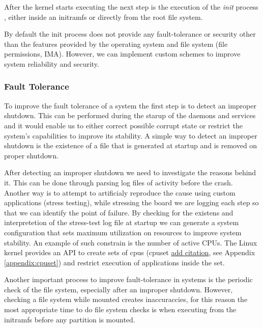 After the kernel starts executing the next step is the execution of the \textit{init} process , either inside an initramfs  or directly from the root file system.

By default the init process does not provide any fault-tolerance or security other than the features provided by the operating system and file system (file permissions, IMA). However, we can implement custom schemes to improve system reliability and security.

\subsubsection{Fault Tolerance}

To improve the fault tolerance of a system the first step is to detect an improper shutdown. This can be performed during the starup of the daemons and services and it would enable us to either correct possible corrupt state or restrict the system's capabilities to improve its stability. A simple way to detect an improper shutdown is the existence of a file that is generated at startup and is removed on proper shutdown. 

After detecting an improper shutdown we need to investigate the reasons behind it. This can be done through parsing log files of activity before the crash. Another way is to attempt to artificialy reproduce the cause using custom applications (stress testing), while stressing the board we are logging each step so that we can identify the point of failure. By checking for the existens and interpretetion of the stress-test log file at startup we can generate a system configuration that sets maximum utilization on resources to improve system stability. An example of such constrain is the number of active CPUs. The Linux kernel provides an API to create sets of cpus (cpuset \underline{add citation}, see Appendix \ref{appendix:cpuset}) and restrict execution of applications inside the set.

Another important process to improve fault-tolerance in systems is the periodic check of the file system, especially after an improper shutdown. However, checking a file system while mounted creates inaccuraccies, for this reason the most appropriate time to do file system checks is when executing from the initramfs before any partition is mounted.

